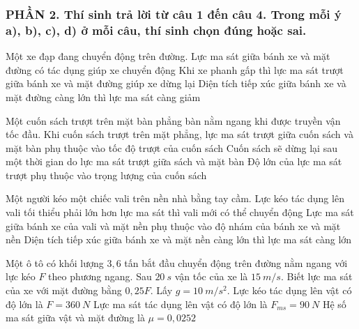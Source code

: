 \subsubsection*{PHẦN 2. Thí sinh trả lời từ câu 1 đến câu 4. Trong mỗi ý a), b), c), d) ở mỗi câu, thí sinh chọn đúng hoặc sai.}
\setcounter{ex}{0}
\begin{ex}%
Một xe đạp đang chuyển động trên đường.
{\True Lực ma sát giữa bánh xe và mặt đường có tác dụng giúp xe chuyển động} 
{\True Khi xe phanh gấp thì lực ma sát trượt giữa bánh xe và mặt đường giúp xe dừng lại} 
{Diện tích tiếp xúc giữa bánh xe và mặt đường càng lớn thì lực ma sát càng giảm} 
\loigiai{ 
\begin{itemchoice}
\itemch
\itemch
\itemch
\itemch
\end{itemchoice}
}
\end{ex}
\begin{ex}%
Một cuốn sách trượt trên mặt bàn phẳng bàn nằm ngang khi được truyền vận tốc đầu.
{Khi cuốn sách trượt trên mặt phẳng, lực ma sát trượt giữa cuốn sách và mặt bàn phụ thuộc vào tốc độ trượt của cuốn sách} 
{\True Cuốn sách sẽ dừng lại sau một thời gian do lực ma sát trượt giữa sách và mặt bàn} 
{\True Độ lớn của lực ma sát trượt phụ thuộc vào trọng lượng của cuốn sách} 
\loigiai{ 
\begin{itemchoice}
\itemch
\itemch
\itemch
\itemch
\end{itemchoice}
}
\end{ex}
\begin{ex}%
Một người kéo một chiếc vali trên nền nhà bằng tay cầm.
{\True Lực kéo tác dụng lên vali tối thiểu phải lớn hơn lực ma sát thì vali mới có thể chuyển động} 
{\True Lực ma sát giữa bánh xe của vali và mặt nền phụ thuộc vào độ nhám của bánh xe và mặt nền} 
{Diện tích tiếp xúc giữa bánh xe và mặt nền càng lớn thì lực ma sát càng lớn} 
\loigiai{ 
\begin{itemchoice}
\itemch
\itemch
\itemch
\itemch
\end{itemchoice}
}
\end{ex}
\begin{ex}%
Một ô tô có khối lượng $3,6$ tấn bắt đầu chuyển động trên đường nằm ngang với lực kéo $F$ theo phương ngang. Sau $20\ s$ vận tốc của xe là $15 \ m/s$. Biết lực ma sát của xe với mặt đường bằng $0,25F$. Lấy $g=10\ m/s^2$.
{Lực kéo tác dụng lên vật có độ lớn là $F=360\ N$} 
{Lực ma sát tác dụng lên vật có độ lớn là $F_{ms}=90\ N$} 
{\True Hệ số ma sát giữa vật và mặt đường là $\mu=0,0252$} 
\loigiai{ 
\begin{itemchoice}
\itemch
\itemch
\itemch
\itemch
\end{itemchoice}
}
\end{ex}
